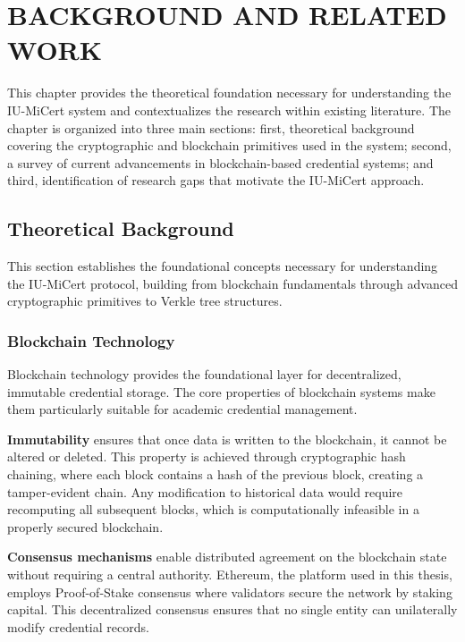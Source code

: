 \chapter{BACKGROUND AND RELATED WORK}
\label{ch:background-related-work}

This chapter provides the theoretical foundation necessary for understanding the IU-MiCert system and contextualizes the research within existing literature. The chapter is organized into three main sections: first, theoretical background covering the cryptographic and blockchain primitives used in the system; second, a survey of current advancements in blockchain-based credential systems; and third, identification of research gaps that motivate the IU-MiCert approach.

\section{Theoretical Background}
This section establishes the foundational concepts necessary for understanding the IU-MiCert protocol, building from blockchain fundamentals through advanced cryptographic primitives to Verkle tree structures.

\subsection{Blockchain Technology}
\label{subsec:blockchain_technology}

Blockchain technology provides the foundational layer for decentralized, immutable credential storage. The core properties of blockchain systems make them particularly suitable for academic credential management.

\textbf{Immutability} ensures that once data is written to the blockchain, it cannot be altered or deleted. This property is achieved through cryptographic hash chaining, where each block contains a hash of the previous block, creating a tamper-evident chain. Any modification to historical data would require recomputing all subsequent blocks, which is computationally infeasible in a properly secured blockchain.

\textbf{Consensus mechanisms} enable distributed agreement on the blockchain state without requiring a central authority. Ethereum, the platform used in this thesis, employs Proof-of-Stake consensus where validators secure the network by staking capital. This decentralized consensus ensures that no single entity can unilaterally modify credential records.

